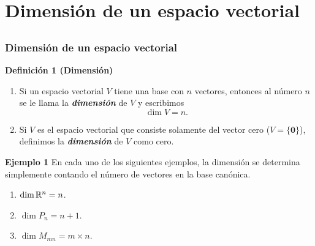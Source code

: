\section{Dimensión de un espacio vectorial}

\subsection{}

{\nologo
\begin{frame}\frametitle{Dimensión de un espacio vectorial}

\begin{block}{\textbf{Definición 1 (Dimensión)}}
	\justifying
	\begin{enumerate}
		\item[\labelname{$a$}] Si un espacio vectorial $V$ tiene una base con $n$ vectores, entonces al número $n$ se le llama la
		\textbf{\textit{dimensión}} de $V$ y escribimos
		\[
		\dim V = n.
		\]
		\item[\labelname{$b$}] Si $V$ es el espacio vectorial que consiste solamente del vector cero ($V=\{\mathbf{0}\}$), definimos
		la \textbf{\textit{dimensión}} de $V$ como cero.
	\end{enumerate}		
\end{block}


\begin{ej}{\textbf{Ejemplo 1 }} \justifying
	En cada uno de los siguientes ejemplos, la dimensión se determina simplemente contando el número de vectores en la 
	base canónica.
	
	\begin{enumerate}
		\item[\labelname{$a$}] $\dim \mathbb{R}^n = n$.
		
		\vspace{1mm}
		\item[\labelname{$b$}] $\dim P_n = n+1$.
		
		\vspace{1mm}
		\item[\labelname{$c$}] $\dim M_{mn} = m\times n$.
	\end{enumerate}
\end{ej}	

\end{frame}
}


